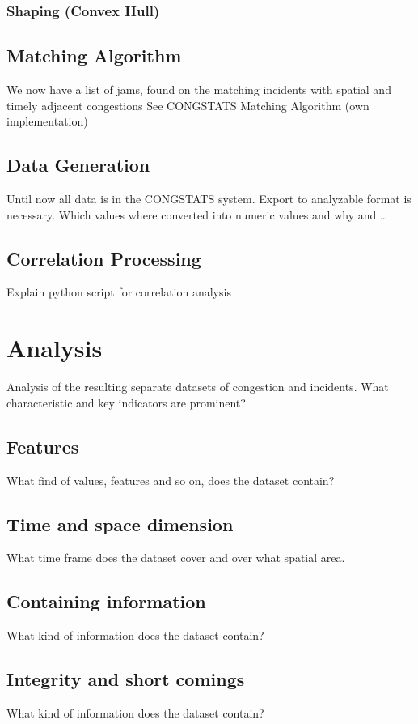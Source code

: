 \documentclass[a4paper,12pt]{report}
\begin{document}
\subsection{Shaping (Convex Hull)}

\section{Matching Algorithm}
We now have a list of jams, found on the matching incidents with spatial and timely adjacent congestions
See CONGSTATS Matching Algorithm (own implementation)
\section{Data Generation}
Until now all data is in the CONGSTATS system. Export to analyzable format is necessary.
Which values where converted into numeric values and why and …
\section{Correlation Processing}
\label{definition_correlation_script}

Explain python script for correlation analysis

\chapter{Analysis}

Analysis of the resulting separate datasets of congestion and incidents. What characteristic and key indicators are prominent?
\section{Features}
What find of values, features and so on, does the dataset contain?
\section{Time and space dimension}
What time frame does the dataset cover and over what spatial area.
\section{Containing information}
What kind of information does the dataset contain?
\section{Integrity and short comings}
What kind of information does the dataset contain?
\end{document}

